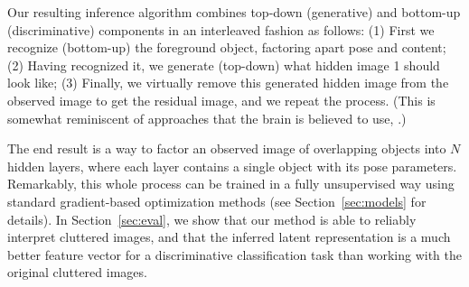 Our resulting inference algorithm combines top-down (generative)
and bottom-up (discriminative) components in an interleaved fashion as follows:
(1)  First we recognize (bottom-up) the foreground object, factoring apart pose and content;
(2) Having recognized it, we generate (top-down) what hidden image 1 should look
like;
(3) Finally, we virtually remove this generated hidden image from the observed
image to get the residual image, and we repeat the process.
(This is somewhat reminiscent of approaches that the brain is believed
to use, \cite{Hochstein2002}.)

The end result is a way to factor an observed image of
overlapping objects into $N$
hidden layers, where each layer contains a single object
with its pose parameters.
Remarkably, this whole process can be trained in a fully unsupervised
way using standard gradient-based optimization methods
(see Section~\ref{sec:models} for details).
In Section~\ref{sec:eval}, we show that our method is able to reliably
interpret cluttered images, and that the inferred latent
representation is a much better  feature vector for a discriminative
classification task than working with the original cluttered images.




